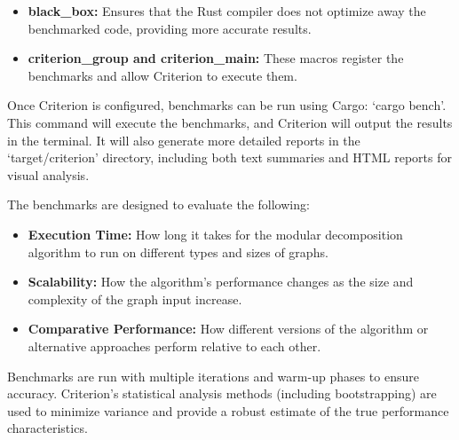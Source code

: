 \begin{itemize}
    \item \textbf{black\_box:} Ensures that the Rust compiler does not optimize away the benchmarked code, providing more accurate results.
    \item \textbf{criterion\_group and criterion\_main:} These macros register the benchmarks and allow Criterion to execute them.
\end{itemize}

Once Criterion is configured, benchmarks can be run using Cargo: `cargo bench'.
This command will execute the benchmarks, and Criterion will output the results in the terminal.
It will also generate more detailed reports in the `target/criterion' directory, including both text summaries and HTML reports for visual analysis.

The benchmarks are designed to evaluate the following:
\begin{itemize}
    \item \textbf{Execution Time:} How long it takes for the modular decomposition algorithm to run on different types and sizes of graphs.
    \item \textbf{Scalability:} How the algorithm’s performance changes as the size and complexity of the graph input increase.
    \item \textbf{Comparative Performance:} How different versions of the algorithm or alternative approaches perform relative to each other.
\end{itemize}

Benchmarks are run with multiple iterations and warm-up phases to ensure accuracy.
Criterion’s statistical analysis methods (including bootstrapping) are used to minimize variance and provide a robust estimate of the true performance characteristics.

